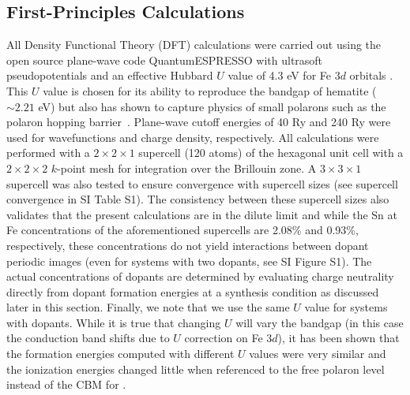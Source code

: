 \subsection{First-Principles Calculations}
All Density Functional Theory (DFT) calculations were carried out using the open source plane-wave code QuantumESPRESSO \cite{QE1} with ultrasoft pseudopotentials \cite{gbrv} and an effective Hubbard $U$ \cite{dudarev1998electron} value of 4.3 eV for Fe $3d$ orbitals \cite{smart2017effect,adelstein2014density}.
This $U$ value is chosen for its ability to reproduce the bandgap of hematite ($\sim2.21$ eV) but also has shown to capture physics of small polarons such as the polaron hopping barrier~\cite{adelstein2014density,smart2017effect}.
Plane-wave cutoff energies of 40 Ry and 240 Ry were used for wavefunctions and charge density, respectively. All calculations were performed with a $2\times 2\times 1$ supercell (120 atoms) of the hexagonal unit cell with a $2\times 2\times 2$ $k$-point mesh for integration over the Brillouin zone. A $3\times 3\times 1$ supercell was also tested to ensure convergence with supercell sizes (see supercell convergence in SI Table S1).
The consistency between these supercell sizes also validates that the present calculations are in the dilute limit and while the Sn at Fe concentrations of the aforementioned supercells are 2.08\% and 0.93\%, respectively, these concentrations do not yield interactions between dopant periodic images (even for systems with two dopants, see SI Figure S1). The actual concentrations of dopants are determined by evaluating charge neutrality directly from dopant formation energies at a synthesis condition as discussed later in this section.
Finally, we note that we use the same $U$ value for systems with dopants. While it is true that changing $U$ will vary the bandgap (in this case the conduction band shifts due to $U$ correction on Fe $3d$), it has been shown that the formation energies computed with different $U$ values were very similar and the ionization energies changed little when referenced to the free polaron level instead of the CBM for .~\cite{smart2017effect}



